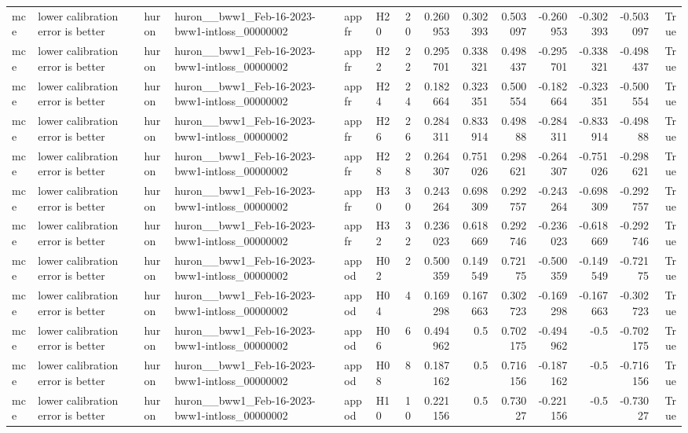 \begin{longtable}{llllllrrrrrrrr}
mce & lower calibration error is better & huron & huron\_\_bww1\_Feb-16-2023-bww1-intloss\_00000002 & appfr & H20 & 20 & 0.260953 & 0.302393 & 0.503097 & -0.260953 & -0.302393 & -0.503097 & True \\
mce & lower calibration error is better & huron & huron\_\_bww1\_Feb-16-2023-bww1-intloss\_00000002 & appfr & H22 & 22 & 0.295701 & 0.338321 & 0.498437 & -0.295701 & -0.338321 & -0.498437 & True \\
mce & lower calibration error is better & huron & huron\_\_bww1\_Feb-16-2023-bww1-intloss\_00000002 & appfr & H24 & 24 & 0.182664 & 0.323351 & 0.500554 & -0.182664 & -0.323351 & -0.500554 & True \\
mce & lower calibration error is better & huron & huron\_\_bww1\_Feb-16-2023-bww1-intloss\_00000002 & appfr & H26 & 26 & 0.284311 & 0.833914 & 0.49888 & -0.284311 & -0.833914 & -0.49888 & True \\
mce & lower calibration error is better & huron & huron\_\_bww1\_Feb-16-2023-bww1-intloss\_00000002 & appfr & H28 & 28 & 0.264307 & 0.751026 & 0.298621 & -0.264307 & -0.751026 & -0.298621 & True \\
mce & lower calibration error is better & huron & huron\_\_bww1\_Feb-16-2023-bww1-intloss\_00000002 & appfr & H30 & 30 & 0.243264 & 0.698309 & 0.292757 & -0.243264 & -0.698309 & -0.292757 & True \\
mce & lower calibration error is better & huron & huron\_\_bww1\_Feb-16-2023-bww1-intloss\_00000002 & appfr & H32 & 32 & 0.236023 & 0.618669 & 0.292746 & -0.236023 & -0.618669 & -0.292746 & True \\
mce & lower calibration error is better & huron & huron\_\_bww1\_Feb-16-2023-bww1-intloss\_00000002 & appod & H02 & 2 & 0.500359 & 0.149549 & 0.72175 & -0.500359 & -0.149549 & -0.72175 & True \\
mce & lower calibration error is better & huron & huron\_\_bww1\_Feb-16-2023-bww1-intloss\_00000002 & appod & H04 & 4 & 0.169298 & 0.167663 & 0.302723 & -0.169298 & -0.167663 & -0.302723 & True \\
mce & lower calibration error is better & huron & huron\_\_bww1\_Feb-16-2023-bww1-intloss\_00000002 & appod & H06 & 6 & 0.494962 & 0.5 & 0.702175 & -0.494962 & -0.5 & -0.702175 & True \\
mce & lower calibration error is better & huron & huron\_\_bww1\_Feb-16-2023-bww1-intloss\_00000002 & appod & H08 & 8 & 0.187162 & 0.5 & 0.716156 & -0.187162 & -0.5 & -0.716156 & True \\
mce & lower calibration error is better & huron & huron\_\_bww1\_Feb-16-2023-bww1-intloss\_00000002 & appod & H10 & 10 & 0.221156 & 0.5 & 0.73027 & -0.221156 & -0.5 & -0.73027 & True \\

\end{longtable}

